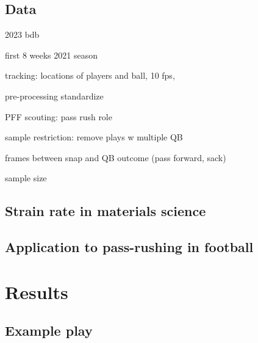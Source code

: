 \documentclass{statsoc}
\begin{document}
\hypertarget{data}{%
\subsection{Data}\label{data}}

2023 bdb \citep{Howard2023NFL}

first 8 weeks 2021 season

tracking: locations of players and ball, 10 fps,

pre-processing standardize

PFF scouting: pass rush role

sample restriction: remove plays w multiple QB

frames between snap and QB outcome (pass forward, sack)

sample size

\hypertarget{strain-rate-in-materials-science}{%
\subsection{Strain rate in materials
science}\label{strain-rate-in-materials-science}}

\hypertarget{application-to-pass-rushing-in-football}{%
\subsection{Application to pass-rushing in
football}\label{application-to-pass-rushing-in-football}}

\hypertarget{results}{%
\section{Results}\label{results}}

\hypertarget{example-play}{%
\subsection{Example play}\label{example-play}}
\end{document}
